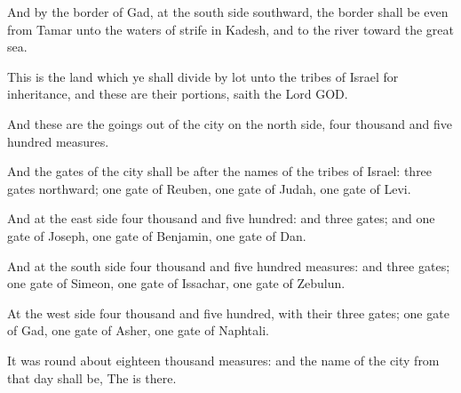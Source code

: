 \verse And by the border of Gad, at the south side southward, the border shall be even from Tamar unto the waters of strife in Kadesh, and to the river toward the great sea.

\verse This is the land which ye shall divide by lot unto the tribes of Israel for inheritance, and these are their portions, saith the Lord GOD.

\verse And these are the goings out of the city on the north side, four thousand and five hundred measures.

\verse And the gates of the city shall be after the names of the tribes of Israel: three gates northward; one gate of Reuben, one gate of Judah, one gate of Levi.

\verse And at the east side four thousand and five hundred: and three gates; and one gate of Joseph, one gate of Benjamin, one gate of Dan.

\verse And at the south side four thousand and five hundred measures: and three gates; one gate of Simeon, one gate of Issachar, one gate of Zebulun.

\verse At the west side four thousand and five hundred, with their three gates; one gate of Gad, one gate of Asher, one gate of Naphtali.

\verse It was round about eighteen thousand measures: and the name of the city from that day shall be, The \LORD is there.

